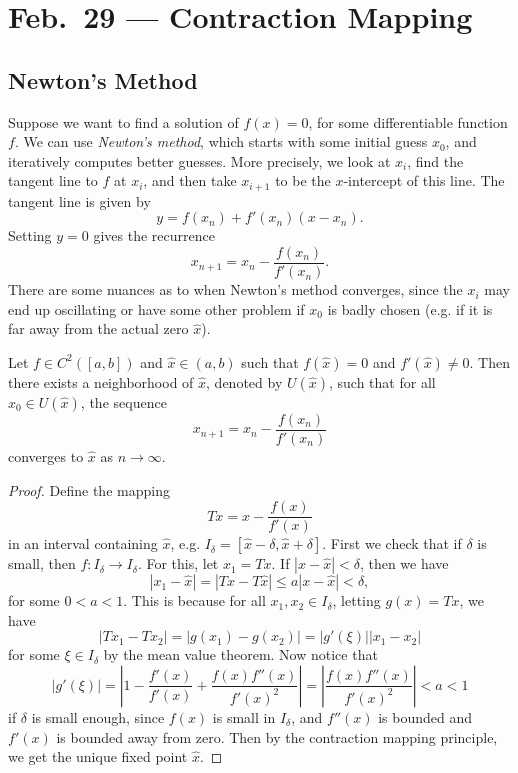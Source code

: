 \chapter{Feb.~29 --- Contraction Mapping}

\section{Newton's Method}
Suppose we want to find a solution of $f(x) = 0$, for
some differentiable function $f$. We can use
\emph{Newton's method}, which starts with some initial
guess $x_0$, and iteratively computes
better guesses. More precisely, we look at $x_i$,
find the tangent line to $f$ at $x_i$, and then
take $x_{i + 1}$ to be the $x$-intercept of this
line. The tangent line is given by
\[
  y = f(x_n) + f'(x_n)(x - x_n).
\]
Setting $y = 0$ gives the recurrence
\[
  x_{n + 1} = x_n - \frac{f(x_n)}{f'(x_n)}.
\]
There are some nuances as to when Newton's method
converges, since the $x_i$ may end up oscillating or
have some other problem if $x_0$ is badly chosen (e.g.
if it is far away from the actual zero $\hat{x}$).

\begin{example}
  Let $f \in C^2([a, b])$ and $\hat{x} \in (a, b)$ such
  that $f(\hat{x}) = 0$ and $f'(\hat{x}) \ne 0$. Then
  there exists a neighborhood of $\hat{x}$, denoted
  by $U(\hat{x})$, such that for all $x_0 \in U(\hat{x})$,
  the sequence
  \[
    x_{n + 1} = x_n - \frac{f(x_n)}{f'(x_n)}
  \]
  converges to $\hat{x}$ as $n \to \infty$.
\end{example}

\begin{proof}
  Define the mapping
  \[
    Tx = x - \frac{f(x)}{f'(x)}
  \]
  in an interval containing $\hat{x}$, e.g.
  $I_{\delta} = [\hat{x} - \delta, \hat{x} + \delta]$.
  First we check that if $\delta$ is small, then
  $f : I_\delta \to I_\delta$. For this, let
  $x_1 = Tx$. If $|x - \hat{x}| < \delta$, then we have
  \[
    |x_1 - \hat{x}| = |Tx - T\hat{x}|
    \le a|x - \hat{x}| < \delta,
  \]
  for some $0 < a < 1$. This is because for all
  $x_1, x_2 \in I_\delta$, letting $g(x) = Tx$, we have
  \[
    |Tx_1 - Tx_2| =
    |g(x_1) - g(x_2)|
    = |g'(\xi)| |x_1 - x_2|
  \]
  for some $\xi \in I_\delta$ by the mean value
  theorem. Now notice that
  \[
    |g'(\xi)| = \left| 1 - \frac{f'(x)}{f'(x)}
    + \frac{f(x)f''(x)}{f'(x)^2} \right|
    = \left| \frac{f(x)f''(x)}{f'(x)^2} \right|
    < a < 1
  \]
  if $\delta$ is small enough, since $f(x)$ is small
  in $I_\delta$, and $f''(x)$ is bounded
  and $f'(x)$ is bounded away from zero. Then by the
  contraction mapping principle, we get the unique
  fixed point $\hat{x}$.
\end{proof}

